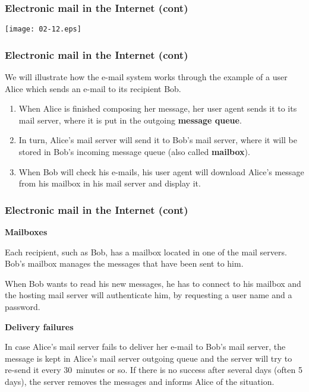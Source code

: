%
\begin{frame}
\frametitle{Electronic mail in the Internet (cont)}

\begin{center}
\texttt{[image: 02-12.eps]}
\end{center}

\end{frame}

%
\begin{frame}
\frametitle{Electronic mail in the Internet (cont)}

We will illustrate how the e-mail system works through the example of
a user Alice which sends an e-mail to its recipient Bob.

\begin{enumerate}

  \item When Alice is finished composing her message, her user agent
    sends it to its mail server, where it is put in the outgoing
    \textbf{message queue}.


  \item In turn, Alice's mail server will send it to Bob's mail
    server, where it will be stored in Bob's incoming message queue
    (also called \textbf{mailbox}).

  \item When Bob will check his e-mails, his user agent will download
    Alice's message from his mailbox in his mail server and display
    it.

\end{enumerate}

\end{frame}

%
\begin{frame}
\frametitle{Electronic mail in the Internet (cont)}

\noindent \textbf{Mailboxes}

Each recipient, such as Bob, has a mailbox located in one of the mail
servers. Bob's mailbox manages the messages that have been sent to
him.

When Bob wants to read his new messages, he has to connect to his
mailbox and the hosting mail server will authenticate him, by
requesting a user name and a password.

\noindent \textbf{Delivery failures}

In case Alice's mail server fails to deliver her e-mail to Bob's mail
server, the message is kept in Alice's mail server outgoing queue and
the server will try to re-send it every 30~minutes or so. If there is
no success after several days (often 5 days), the server removes the
messages and informs Alice of the situation.

\end{frame}

